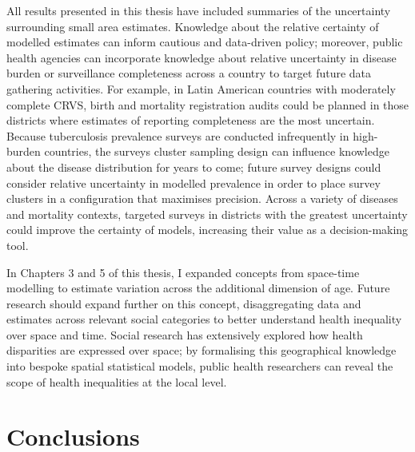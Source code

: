 \documentclass[
]{report}
\begin{document}
All results presented in this thesis have included summaries of the uncertainty surrounding small area estimates. Knowledge about the relative certainty of modelled estimates can inform cautious and data-driven policy; moreover, public health agencies can incorporate knowledge about relative uncertainty in disease burden or surveillance completeness across a country to target future data gathering activities. For example, in Latin American countries with moderately complete CRVS, birth and mortality registration audits could be planned in those districts where estimates of reporting completeness are the most uncertain. Because tuberculosis prevalence surveys are conducted infrequently in high-burden countries, the surveys cluster sampling design can influence knowledge about the disease distribution for years to come; future survey designs could consider relative uncertainty in modelled prevalence in order to place survey clusters in a configuration that maximises precision. Across a variety of diseases and mortality contexts, targeted surveys in districts with the greatest uncertainty could improve the certainty of models, increasing their value as a decision-making tool.

In Chapters 3 and 5 of this thesis, I expanded concepts from space-time modelling to estimate variation across the additional dimension of age. Future research should expand further on this concept, disaggregating data and estimates across relevant social categories to better understand health inequality over space and time. Social research has extensively explored how health disparities are expressed over space; by formalising this geographical knowledge into bespoke spatial statistical models, public health researchers can reveal the scope of health inequalities at the local level.

\hypertarget{conclusions-3}{%
\section{Conclusions}\label{conclusions-3}}
\end{document}
